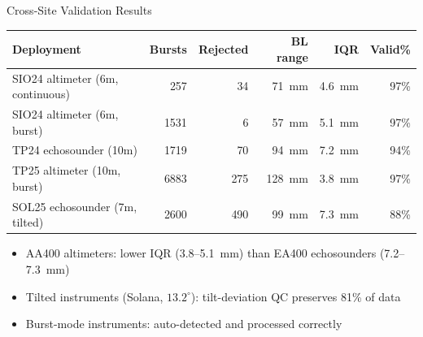 \documentclass[10pt, aspectratio=169]{beamer}
\begin{document}
\begin{frame}{Cross-Site Validation Results}
  \begin{table}
    \small
    \begin{tabular}{lrrrrr}
      \toprule
      Deployment & Bursts & Rejected & BL range & IQR & Valid\% \\
      \midrule
      SIO24 altimeter (6m, continuous) & 257 & 34 & 71~mm & 4.6~mm & 97\% \\
      SIO24 altimeter (6m, burst) & 1531 & 6 & 57~mm & 5.1~mm & 97\% \\
      TP24 echosounder (10m) & 1719 & 70 & 94~mm & 7.2~mm & 94\% \\
      TP25 altimeter (10m, burst) & 6883 & 275 & 128~mm & 3.8~mm & 97\% \\
      SOL25 echosounder (7m, tilted) & 2600 & 490 & 99~mm & 7.3~mm & 88\% \\
      \bottomrule
    \end{tabular}
  \end{table}
  \begin{itemize}
    \item AA400 altimeters: lower IQR (3.8--5.1~mm) than EA400 echosounders (7.2--7.3~mm)
    \item Tilted instruments (Solana, $13.2^\circ$): tilt-deviation QC preserves 81\% of data
    \item Burst-mode instruments: auto-detected and processed correctly
  \end{itemize}
\end{frame}
\end{document}
